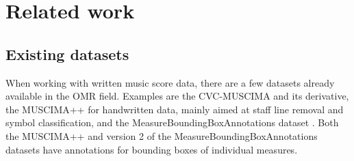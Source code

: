 \chapter{Related work}\label{chap:related-work}


\section{Existing datasets}\label{sec:related-work-existing-datasets}
When working with written music score data, there are a few datasets already available in the OMR field. Examples are the CVC-MUSCIMA \citep{Fornes2012} and its derivative, the MUSCIMA++ \citep{Hajic2017} for handwritten data, mainly aimed at staff line removal and symbol classification, and the MeasureBoundingBoxAnnotations dataset \citep{Zalkow2019}. Both the MUSCIMA++ and version 2 of the MeasureBoundingBoxAnnotations datasets have annotations for bounding boxes of individual measures.

